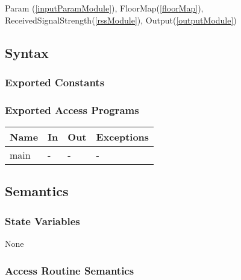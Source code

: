 \documentclass[12pt, titlepage]{article}
\begin{document}
Param (\autoref{inputParamModule}), FloorMap(\autoref{floorMap}), ReceivedSignalStrength(\autoref{rssModule}), Output(\autoref{outputModule})

\subsection{Syntax}

\subsubsection{Exported Constants}

\subsubsection{Exported Access Programs}

\begin{center}
\begin{tabular}{p{2cm} p{4cm} p{4cm} p{2cm}}
\hline
\textbf{Name} & \textbf{In} & \textbf{Out} & \textbf{Exceptions} \\
\hline
main & - & - & - \\
\hline
\end{tabular}
\end{center}

\subsection{Semantics}

\subsubsection{State Variables}

None

\subsubsection{Access Routine Semantics}
\end{document}
